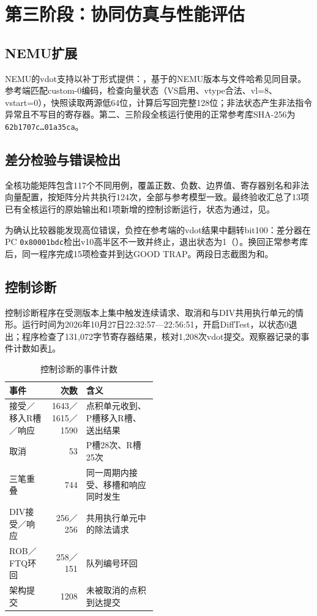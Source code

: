 \section{第三阶段：协同仿真与性能评估}

\subsection{NEMU扩展}\label{sec:s3-nemu}

NEMU的vdot支持以补丁形式提供：，基于的NEMU版本与文件哈希见同目录。参考端匹配custom-0编码，检查向量状态（VS启用、vtype合法、vl=8、vstart=0），快照读取两源低64位，计算后写回完整128位；非法状态产生非法指令异常且不写目的寄存器。第二、三阶段全核运行使用的正常参考库SHA-256为\texttt{62b1707c…01a35ca}。

\subsection{差分检验与错误检出}\label{sec:s3-diff}

全核功能矩阵包含117个不同用例，覆盖正数、负数、边界值、寄存器别名和非法向量配置，按矩阵分片共执行124次，全部与参考模型一致。最终验收汇总了13项已有全核运行的原始输出和1项新增的控制诊断运行，状态为通过，见。

为确认比较器能发现高位错误，负控在参考端的vdot结果中翻转bit100：差分器在PC \texttt{0x80001bdc}检出v10高半区不一致并终止，退出状态为1（）。换回正常参考库后，同一程序完成15项检查并到达GOOD TRAP。两段日志截图为和。

\subsection{控制诊断}\label{sec:s3-control}

控制诊断程序在受测版本上集中触发连续请求、取消和与DIV共用执行单元的情形。运行时间为2026年10月27日22:32:57—22:56:51，开启DiffTest，以状态0退出；程序检查了131,072字节寄存器结果，核对1,208次vdot提交。观察器记录的事件计数如表\ref{tab:control}。

\begin{table}[!htbp]\centering\small
\caption{控制诊断的事件计数}\label{tab:control}
\begin{tabular}{lrp{0.48\linewidth}}
\toprule
事件 & 次数 & 含义\\
\midrule
接受／移入R槽／响应 & 1643／1615／1590 & 点积单元收到、P槽移入R槽、送出结果\\
取消 & 53 & P槽28次、R槽25次\\
三笔重叠 & 744 & 同一周期内接受、移槽和响应同时发生\\
DIV接受／响应 & 256／256 & 共用执行单元中的除法请求\\
ROB／FTQ环回 & 258／151 & 队列编号环回\\
架构提交 & 1208 & 未被取消的点积到达提交\\
\bottomrule
\end{tabular}
\end{table}

